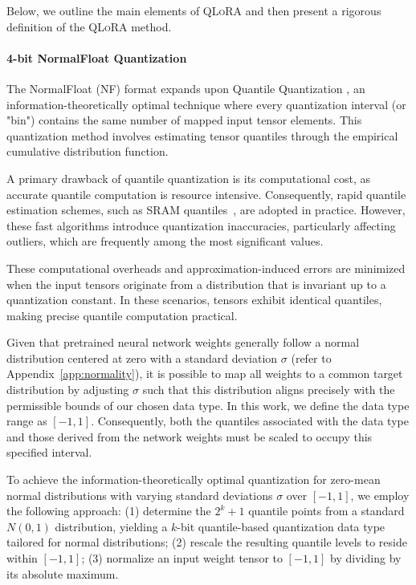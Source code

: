 Below, we outline the main elements of \textsc{QLoRA} and then present a rigorous definition of the \textsc{QLoRA} method.

\paragraph{4-bit NormalFloat Quantization} The NormalFloat (NF) format expands upon Quantile Quantization \citep{dettmers2022optimizers}, an information-theoretically optimal technique where every quantization interval (or "bin") contains the same number of mapped input tensor elements. This quantization method involves estimating tensor quantiles through the empirical cumulative distribution function.

A primary drawback of quantile quantization is its computational cost, as accurate quantile computation is resource intensive. Consequently, rapid quantile estimation schemes, such as SRAM quantiles~\citep{dettmers2022optimizers}, are adopted in practice. However, these fast algorithms introduce quantization inaccuracies, particularly affecting outliers, which are frequently among the most significant values.

These computational overheads and approximation-induced errors are minimized when the input tensors originate from a distribution that is invariant up to a quantization constant. In these scenarios, tensors exhibit identical quantiles, making precise quantile computation practical.

Given that pretrained neural network weights generally follow a normal distribution centered at zero with a standard deviation $\sigma$ (refer to Appendix~\ref{app:normality}), it is possible to map all weights to a common target distribution by adjusting $\sigma$ such that this distribution aligns precisely with the permissible bounds of our chosen data type. In this work, we define the data type range as $[-1, 1]$. Consequently, both the quantiles associated with the data type and those derived from the network weights must be scaled to occupy this specified interval.

To achieve the information-theoretically optimal quantization for zero-mean normal distributions with varying standard deviations $\sigma$ over $[-1, 1]$, we employ the following approach: (1) determine the $2^k+1$ quantile points from a standard $N(0,1)$ distribution, yielding a $k$-bit quantile-based quantization data type tailored for normal distributions; (2) rescale the resulting quantile levels to reside within $[-1, 1]$; (3) normalize an input weight tensor to $[-1, 1]$ by dividing by its absolute maximum. 

